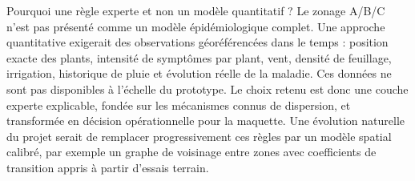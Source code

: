 ﻿\documentclass[11pt,a4paper,openany]{report}
\begin{document}
\begin{importantbox}{Pourquoi une règle experte et non un modèle quantitatif ?}
Le zonage A/B/C n'est pas présenté comme un modèle épidémiologique complet. Une approche quantitative exigerait des observations géoréférencées dans le temps : position exacte des plants, intensité de symptômes par plant, vent, densité de feuillage, irrigation, historique de pluie et évolution réelle de la maladie. Ces données ne sont pas disponibles à l'échelle du prototype. Le choix retenu est donc une couche experte explicable, fondée sur les mécanismes connus de dispersion, et transformée en décision opérationnelle pour la maquette. Une évolution naturelle du projet serait de remplacer progressivement ces règles par un modèle spatial calibré, par exemple un graphe de voisinage entre zones avec coefficients de transition appris à partir d'essais terrain.
\end{importantbox}
\end{document}
